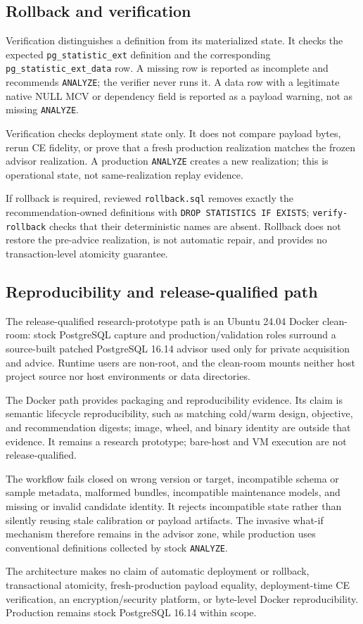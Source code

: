 \subsection{Rollback and verification}

Verification distinguishes a definition from its materialized state.  It
checks the expected \texttt{pg\_statistic\_ext} definition and the
corresponding \texttt{pg\_statistic\_ext\_data} row.  A missing row is
reported as incomplete and recommends \texttt{ANALYZE}; the verifier never
runs it.  A data row with a legitimate native NULL MCV or dependency field is
reported as a payload warning, not as missing \texttt{ANALYZE}.

Verification checks deployment state only.  It does not compare payload bytes,
rerun CE fidelity, or prove that a fresh production realization matches the
frozen advisor realization.  A production \texttt{ANALYZE} creates a new
realization; this is operational state, not same-realization replay evidence.

If rollback is required, reviewed \texttt{rollback.sql} removes exactly the
recommendation-owned definitions with \texttt{DROP STATISTICS IF EXISTS};
\texttt{verify-rollback} checks that their deterministic names are absent.
Rollback does not restore the pre-advice realization, is not automatic repair,
and provides no transaction-level atomicity guarantee.

\subsection{Reproducibility and release-qualified path}

The release-qualified research-prototype path is an Ubuntu 24.04 Docker
clean-room: stock PostgreSQL capture and production/validation roles surround
a source-built patched PostgreSQL 16.14 advisor used only for private
acquisition and advice.  Runtime users are non-root, and the clean-room
mounts neither host project source nor host environments or data directories.

The Docker path provides packaging and reproducibility evidence.  Its claim is
semantic lifecycle reproducibility, such as matching cold/warm design,
objective, and recommendation digests; image, wheel, and binary identity are
outside that evidence.  It remains a research prototype; bare-host and VM
execution are not release-qualified.

The workflow fails closed on wrong version or target, incompatible schema or
sample metadata, malformed bundles, incompatible maintenance models, and
missing or invalid candidate identity.  It rejects incompatible state rather
than silently reusing stale calibration or payload artifacts.  The invasive
what-if mechanism therefore remains in the advisor zone, while production uses
conventional definitions collected by stock \texttt{ANALYZE}.

The architecture makes no claim of automatic deployment or rollback,
transactional atomicity, fresh-production payload equality, deployment-time CE
verification, an encryption/security platform, or byte-level Docker
reproducibility.  Production remains stock PostgreSQL 16.14 within scope.
